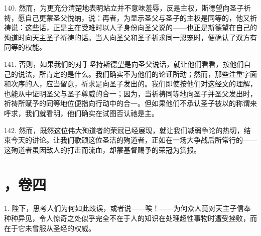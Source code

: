 140. 然而，为更充分清楚地表明站立并不意味羞辱，反是主权，斯德望向圣子祈祷，愿自己更蒙圣父悦纳，说：再者，为显示圣父与圣子的主权是同等的，他又祈祷说：这些话，正是主在受难时以人子身份向圣父说的——也正是斯德望在自己的殉道时向天主圣子祈祷的话。当人向圣父和圣子祈求同一恩宠时，便确认了双方有同等的权能。\par

141. 否则，如果我们的对手坚持斯德望是向圣父说话，就让他们看看，按他们自己的说法，所肯定的是什么。我们确实不为他们的论证所动；然而，那些注重字面和次序的人，应当留意，祈求是向圣子发出的。我们即使按他们对这经文的理解，也能从中证明圣父与圣子尊威的合一；因为，当祈祷同等地向圣子并圣父发出时，祈祷所赋予的同等地位便指向行动中的合一。但如果他们不承认圣子被以的称谓来呼求，我们就看明，他们确实在试图否认祂是主。\par

142. 然而，既然这位伟大殉道者的荣冠已经展现，就让我们减弱争论的热切，结束今天的讲论。让我们歌颂这位圣洁的殉道者，正如在一场大争战后所常行的——这殉道者虽因敌人的打击而流血，却蒙基督赐予的荣冠为赏报。\par



\section{，卷四}


\par

1. 陛下，思考人们为何如此歧误，或者说——唉！——为何众人竟对天主子信奉种种异见，令人惊奇之处似乎完全不在于人的知识在处理超性事物时遭受挫败，而在于它未曾服从圣经的权威。\par

